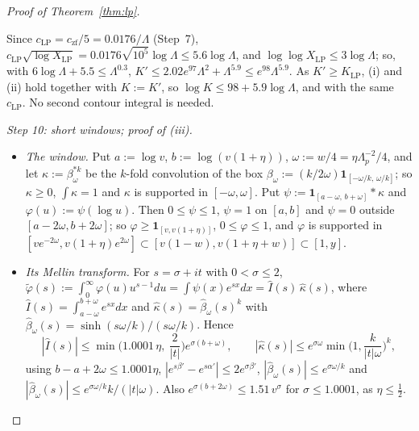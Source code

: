 \begin{proof}[Proof of Theorem~\ref{thm:lp}]
\begin{itemize}
\[  \]
  Since $c_{\mathrm{LP}}=c_{\mathrm{zf}}/5=0.0176/\Lambda$ (Step~7), $c_{\mathrm{LP}}\sqrt{\log X_{\mathrm{LP}}}=0.0176\sqrt{10^5}\log\Lambda\le5.6\log\Lambda$,
  and $\log\log X_{\mathrm{LP}}\le3\log\Lambda$; so, with $6\log\Lambda+5.5\le\Lambda^{0.3}$,
  $K'\le2.02e^{97}\Lambda^2+\Lambda^{5.9}\le e^{98}\Lambda^{5.9}$. As $K'\ge K_{\mathrm{LP}}$, (i) and (ii) hold together with $K:=K'$, so
  $\log K\le98+5.9\log\Lambda$, and with the same $c_{\mathrm{LP}}$. No second contour integral is needed.
\end{itemize}

\emph{Step 10: short windows; proof of (iii).}
\begin{itemize}
\item \emph{The window.} Put $a:=\log v$, $b:=\log(v(1+\eta))$, $\omega:=w/4=\eta\Lambda_p^{-2}/4$, and let $\kappa:=\beta_\omega^{*k}$ be the
  $k$-fold convolution of the box $\beta_\omega:=(k/2\omega)\mathbf 1_{[-\omega/k,\,\omega/k]}$; so $\kappa\ge0$, $\int\kappa=1$ and
  $\kappa$ is supported in $[-\omega,\omega]$. Put $\psi:=\mathbf 1_{[a-\omega,\,b+\omega]}*\kappa$ and $\varphi(u):=\psi(\log u)$.
  Then $0\le\psi\le1$, $\psi=1$ on $[a,b]$ and $\psi=0$ outside $[a-2\omega,b+2\omega]$; so $\varphi\ge\mathbf 1_{[v,v(1+\eta)]}$,
  $0\le\varphi\le1$, and $\varphi$ is supported in $[ve^{-2\omega},v(1+\eta)e^{2\omega}]\subset[v(1-w),v(1+\eta+w)]\subset[1,y]$.
\item \emph{Its Mellin transform.} For $s=\sigma+it$ with $0<\sigma\le2$,
  $\tilde\varphi(s):=\int_0^\infty\varphi(u)u^{s-1}du=\int\psi(x)e^{sx}dx=\hat I(s)\,\hat\kappa(s)$, where
  $\hat I(s)=\int_{a-\omega}^{b+\omega}e^{sx}dx$ and $\hat\kappa(s)=\hat\beta_\omega(s)^k$ with $\hat\beta_\omega(s)=\sinh(s\omega/k)/(s\omega/k)$. Hence
  \[
    |\hat I(s)|\le\min\Big(1.0001\,\eta,\ \frac2{|t|}\Big)e^{\sigma(b+\omega)},\qquad
    |\hat\kappa(s)|\le e^{\sigma\omega}\min\Big(1,\frac k{|t|\omega}\Big)^k,
  \]
  using $b-a+2\omega\le1.0001\eta$, $|e^{s\beta'}-e^{s\alpha'}|\le2e^{\sigma\beta'}$, $|\hat\beta_\omega(s)|\le e^{\sigma\omega/k}$ and
  $|\hat\beta_\omega(s)|\le e^{\sigma\omega/k}k/(|t|\omega)$. Also $e^{\sigma(b+2\omega)}\le1.51\,v^\sigma$ for $\sigma\le1.0001$, as $\eta\le\frac12$.

\end{itemize}
\end{proof}
